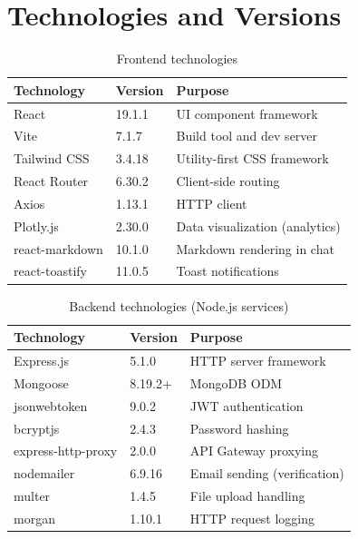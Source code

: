 \documentclass[a4paper,12pt]{report}
\begin{document}
\section{Technologies and Versions}

\begin{table}[H]
\centering
\caption{Frontend technologies}
\begin{tabularx}{\textwidth}{llX}
    \toprule
    \textbf{Technology} & \textbf{Version} & \textbf{Purpose} \\
    \midrule
    React & 19.1.1 & UI component framework \\
    Vite & 7.1.7 & Build tool and dev server \\
    Tailwind CSS & 3.4.18 & Utility-first CSS framework \\
    React Router & 6.30.2 & Client-side routing \\
    Axios & 1.13.1 & HTTP client \\
    Plotly.js & 2.30.0 & Data visualization (analytics) \\
    react-markdown & 10.1.0 & Markdown rendering in chat \\
    react-toastify & 11.0.5 & Toast notifications \\
    \bottomrule
\end{tabularx}
\end{table}

\begin{table}[H]
\centering
\caption{Backend technologies (Node.js services)}
\begin{tabularx}{\textwidth}{llX}
    \toprule
    \textbf{Technology} & \textbf{Version} & \textbf{Purpose} \\
    \midrule
    Express.js & 5.1.0 & HTTP server framework \\
    Mongoose & 8.19.2+ & MongoDB ODM \\
    jsonwebtoken & 9.0.2 & JWT authentication \\
    bcryptjs & 2.4.3 & Password hashing \\
    express-http-proxy & 2.0.0 & API Gateway proxying \\
    nodemailer & 6.9.16 & Email sending (verification) \\
    multer & 1.4.5 & File upload handling \\
    morgan & 1.10.1 & HTTP request logging \\
    \bottomrule
\end{tabularx}
\end{table}
\end{document}
